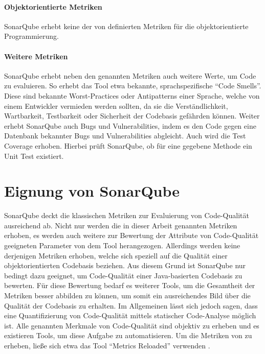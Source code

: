 \documentclass[a4paper, 12pt]{article}
\begin{document}
\paragraph{Objektorientierte Metriken}
SonarQube erhebt keine der von \textcite{Metrics_OO_design} definierten Metriken für die objektorientierte Programmierung.

\paragraph{Weitere Metriken}
SonarQube erhebt neben den genannten Metriken auch weitere Werte, um Code zu evaluieren.
So erhebt das Tool etwa bekannte, sprachspezifische \enquote{Code Smells}.
Diese sind bekannte Worst-Practices oder Antipatterns einer Sprache, welche von einem Entwickler vermieden werden sollten, da sie die Verständlichkeit, Wartbarkeit, Testbarkeit oder Sicherheit der Codebasis gefährden können.
Weiter erhebt SonarQube auch Bugs und Vulnerabilities, indem es den Code gegen eine Datenbank bekannter Bugs und Vulnerabilities abgleicht.
Auch wird die Test Coverage erhoben. 
Hierbei prüft SonarQube, ob  für eine gegebene Methode ein Unit Test existiert.


\section{Eignung von SonarQube}
SonarQube deckt die klassischen Metriken zur Evaluierung von Code-Qualität ausreichend ab.
Nicht nur werden die in dieser Arbeit genannten Metriken erhoben, es werden auch weitere zur Bewertung der Attribute von Code-Qualität geeigneten Parameter von dem Tool herangezogen.
Allerdings werden keine derjenigen Metriken erhoben, welche sich speziell auf die Qualität einer objektorientierten Codebasis beziehen.
Aus diesem Grund ist SonarQube nur bedingt dazu geeignet, um Code-Qualität einer Java-basierten Codebasis zu bewerten.  
Für diese Bewertung bedarf es weiterer Tools, um die Gesamtheit der Metriken besser abbilden zu können, um somit ein ausreichendes Bild über die Qualität der Codebasis zu erhalten.
Im Allgemeinen lässt sich jedoch sagen, dass eine Quantifizierung von Code-Qualität mittels statischer Code-Analyse möglich ist. 
Alle genannten Merkmale von Code-Qualität sind objektiv zu erheben und es existieren Tools, um diese Aufgabe zu automatisieren.
Um die Metriken von \textcite{Metrics_OO_design} zu erheben, ließe sich etwa das Tool \enquote{Metrics Reloaded} verwenden \parencite{metrics_reloaded}.

\newpage
\printbibliography
\end{document}
